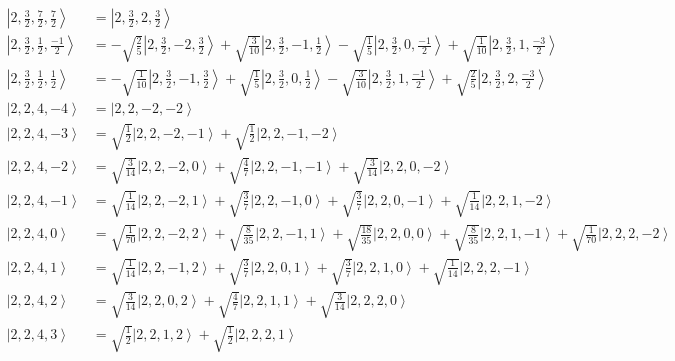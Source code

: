 \documentclass{report}
\newcommand{\ket}[1]{\left| #1 \right>} %
\begin{document}
\begin{align*}
\ket{ 2 ,  \frac{3}{2} ,  \frac{7}{2} ,  \frac{7}{2}  } &=  \ket{ 2 ,  \frac{3}{2} ,  2 ,  \frac{3}{2}  } \\
\ket{ 2 ,  \frac{3}{2} ,  \frac{1}{2} ,  \frac{-1}{2}  } &=  - \sqrt{  \frac{2}{5}  } \ket{ 2 ,  \frac{3}{2} ,  -2 ,  \frac{3}{2}  } + \sqrt{  \frac{3}{10}  } \ket{ 2 ,  \frac{3}{2} ,  -1 ,  \frac{1}{2}  } - \sqrt{  \frac{1}{5}  } \ket{ 2 ,  \frac{3}{2} ,  0 ,  \frac{-1}{2}  } + \sqrt{  \frac{1}{10}  } \ket{ 2 ,  \frac{3}{2} ,  1 ,  \frac{-3}{2}  } \\
\ket{ 2 ,  \frac{3}{2} ,  \frac{1}{2} ,  \frac{1}{2}  } &=  - \sqrt{  \frac{1}{10}  } \ket{ 2 ,  \frac{3}{2} ,  -1 ,  \frac{3}{2}  } + \sqrt{  \frac{1}{5}  } \ket{ 2 ,  \frac{3}{2} ,  0 ,  \frac{1}{2}  } - \sqrt{  \frac{3}{10}  } \ket{ 2 ,  \frac{3}{2} ,  1 ,  \frac{-1}{2}  } + \sqrt{  \frac{2}{5}  } \ket{ 2 ,  \frac{3}{2} ,  2 ,  \frac{-3}{2}  } \\
\ket{ 2 ,  2 ,  4 ,  -4  } &=  \ket{ 2 ,  2 ,  -2 ,  -2  } \\
\ket{ 2 ,  2 ,  4 ,  -3  } &=  \sqrt{  \frac{1}{2}  } \ket{ 2 ,  2 ,  -2 ,  -1  } + \sqrt{  \frac{1}{2}  } \ket{ 2 ,  2 ,  -1 ,  -2  } \\
\ket{ 2 ,  2 ,  4 ,  -2  } &=  \sqrt{  \frac{3}{14}  } \ket{ 2 ,  2 ,  -2 ,  0  } + \sqrt{  \frac{4}{7}  } \ket{ 2 ,  2 ,  -1 ,  -1  } + \sqrt{  \frac{3}{14}  } \ket{ 2 ,  2 ,  0 ,  -2  } \\
\ket{ 2 ,  2 ,  4 ,  -1  } &=  \sqrt{  \frac{1}{14}  } \ket{ 2 ,  2 ,  -2 ,  1  } + \sqrt{  \frac{3}{7}  } \ket{ 2 ,  2 ,  -1 ,  0  } + \sqrt{  \frac{3}{7}  } \ket{ 2 ,  2 ,  0 ,  -1  } + \sqrt{  \frac{1}{14}  } \ket{ 2 ,  2 ,  1 ,  -2  } \\
\ket{ 2 ,  2 ,  4 ,  0  } &=  \sqrt{  \frac{1}{70}  } \ket{ 2 ,  2 ,  -2 ,  2  } + \sqrt{  \frac{8}{35}  } \ket{ 2 ,  2 ,  -1 ,  1  } + \sqrt{  \frac{18}{35}  } \ket{ 2 ,  2 ,  0 ,  0  } + \sqrt{  \frac{8}{35}  } \ket{ 2 ,  2 ,  1 ,  -1  } + \sqrt{  \frac{1}{70}  } \ket{ 2 ,  2 ,  2 ,  -2  } \\
\ket{ 2 ,  2 ,  4 ,  1  } &=  \sqrt{  \frac{1}{14}  } \ket{ 2 ,  2 ,  -1 ,  2  } + \sqrt{  \frac{3}{7}  } \ket{ 2 ,  2 ,  0 ,  1  } + \sqrt{  \frac{3}{7}  } \ket{ 2 ,  2 ,  1 ,  0  } + \sqrt{  \frac{1}{14}  } \ket{ 2 ,  2 ,  2 ,  -1  } \\
\ket{ 2 ,  2 ,  4 ,  2  } &=  \sqrt{  \frac{3}{14}  } \ket{ 2 ,  2 ,  0 ,  2  } + \sqrt{  \frac{4}{7}  } \ket{ 2 ,  2 ,  1 ,  1  } + \sqrt{  \frac{3}{14}  } \ket{ 2 ,  2 ,  2 ,  0  } \\
\ket{ 2 ,  2 ,  4 ,  3  } &=  \sqrt{  \frac{1}{2}  } \ket{ 2 ,  2 ,  1 ,  2  } + \sqrt{  \frac{1}{2}  } \ket{ 2 ,  2 ,  2 ,  1  } \\

\end{align*}
\end{document}
